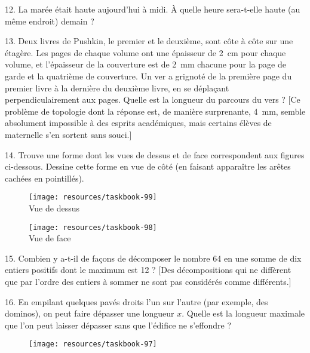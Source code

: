 \begin{problem}{12.}
	La marée était haute aujourd'hui à midi. À quelle heure sera-t-elle haute (au même endroit) demain ?
\end{problem}

\begin{problem}{13.}
	Deux livres de Pushkin, le premier et le deuxième, sont côte à côte sur une étagère.
	Les pages de chaque volume ont une épaisseur de \SI{2}{\cm} pour chaque volume,
	et l'épaisseur de la couverture est de \SI{2}{\mm} chacune pour la page de garde et la quatrième
	de couverture.
	Un ver a grignoté de la première page du premier livre à la dernière du deuxième livre, en
	se déplaçant perpendiculairement aux pages.
	Quelle est la longueur du parcours du vers ?
	[Ce problème de topologie dont la réponse est, de manière surprenante, \SI{4}{\mm}, semble
	absolument impossible à des esprits académiques, mais certains élèves de maternelle
	s'en sortent sans souci.]
\end{problem}

\begin{problem}{14.}
	Trouve une forme dont les vues de dessus et de face correspondent aux figures ci-dessous.
	Dessine cette forme en vue de côté (en faisant apparaître les arêtes cachées en pointillés).
	\begin{figure}
		\footnotesize
		\null\hfill
		\parbox{0.2\linewidth}{\centering\texttt{[image: resources/taskbook-99]}\\Vue de dessus}
		\hfill
		\parbox{0.2\linewidth}{\centering\texttt{[image: resources/taskbook-98]}\\Vue de face}
		\hfill\null
	\end{figure}
\end{problem}

\begin{problem}{15.}
	Combien y a-t-il de façons de décomposer le nombre 64 en une somme de dix entiers positifs dont
	le maximum est 12 ?
	[Des décompositions qui ne diffèrent que par l'ordre des entiers à sommer ne sont pas considérés
	comme différents.]
\end{problem}

\begin{problem}{16.}
	En empilant quelques pavés droits l'un sur l'autre (par exemple, des dominos),
	on peut faire dépasser une longueur $x$.
	Quelle est la longueur maximale que l'on peut laisser dépasser sans que l'édifice ne s'effondre ?
	\begin{figure}
		\texttt{[image: resources/taskbook-97]}
	\end{figure}
\end{problem}

